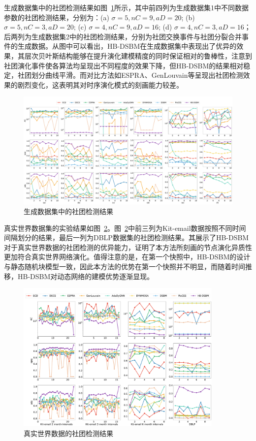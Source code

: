 生成数据集中的社团检测结果如图~\ref{fig.4.2}所示，其中前四列为生成数据集1中不同数据参数的社团检测结果，分别为：(a) $\sigma =5, nC=9, aD=20$; (b) $\sigma =5, nC=3, aD=20$; (c) $\sigma =4, nC=9, aD=16$; (d) $\sigma =4, nC=3, aD=16$；后两列为生成数据集2中的社团检测结果，分别为社团交换事件与社团分裂合并事件的生成数据。从图中可以看出，HB-DSBM在生成数据集中表现出了优异的效果，其层次贝叶斯结构能够在提升演化建模精度的同时保证相对的鲁棒性，注意到社团演化事件使各算法均呈现出不同程度的效果下降，但HB-DSBM的结果相对稳定，社团划分曲线平滑。而对比方法如ESPRA、GenLouvain等呈现出社团检测效果的剧烈变化，这表明其对时序演化模式的刻画能力较差。


\begin{figure}[htbp]
	\centering
	\includegraphics[width=\textwidth]{figures/chap03/dsbm/chap3generateData1223.pdf}
	\caption{生成数据集中的社团检测结果}
	\label{fig.4.2}
\end{figure}



真实世界数据集的实验结果如图~\ref{fig.4.4}。图~\ref{fig.4.4}中前三列为Kit-email数据按照不同时间间隔划分的结果，最后一列为DBLP数据集的社团检测结果。其展示了HB-DSBM对于真实世界数据的社团检测的优异能力，证明了本方法所刻画的节点演化异质性更加符合真实世界网络演化。值得注意的是，在第一个快照中，HB-DSBM的设计与静态随机块模型一致，因此本方法的优势在第一个快照并不明显，而随着时间推移，HB-DSBM对动态网络的建模优势逐渐显现。



\begin{figure}[htbp]
	\centering
	\includegraphics[width=0.9\textwidth]{figures/chap03/dsbm/chap3realData1223.pdf}
	\caption{真实世界数据的社团检测结果}
	\label{fig.4.4}
\end{figure}




